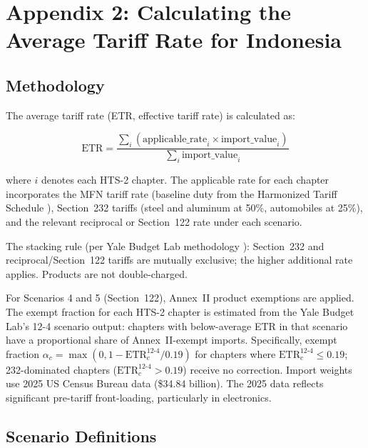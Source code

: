 \documentclass[12pt,a4paper]{article}
\begin{document}
\section*{Appendix 2: Calculating the Average Tariff Rate for Indonesia}

\subsection*{Methodology}

The average tariff rate (ETR, effective tariff rate) is calculated as:

\begin{equation}
\text{ETR} = \frac{\sum_{i} (\text{applicable\_rate}_i \times \text{import\_value}_i)}{\sum_{i} \text{import\_value}_i}
\end{equation}

\noindent where $i$ denotes each HTS-2 chapter. The applicable rate for each chapter incorporates the MFN tariff rate (baseline duty from the Harmonized Tariff Schedule \cite{usitc_hts,wto_tariff}), Section~232 tariffs (steel and aluminum at 50\%, automobiles at 25\%), and the relevant reciprocal or Section~122 rate under each scenario.

The stacking rule (per Yale Budget Lab methodology \cite{yalebudgetlab_model}): Section~232 and reciprocal/Section~122 tariffs are mutually exclusive; the higher additional rate applies. Products are not double-charged.

For Scenarios 4 and 5 (Section~122), Annex~II product exemptions are applied. The exempt fraction for each HTS-2 chapter is estimated from the Yale Budget Lab's 12-4 scenario output: chapters with below-average ETR in that scenario have a proportional share of Annex~II-exempt imports. Specifically, exempt fraction $\alpha_c = \max(0, 1 - \text{ETR}_{c}^{12\text{-}4}/0.19)$ for chapters where $\text{ETR}_{c}^{12\text{-}4} \leq 0.19$; 232-dominated chapters ($\text{ETR}_{c}^{12\text{-}4} > 0.19$) receive no correction. Import weights use 2025 US Census Bureau data (\$34.84 billion). The 2025 data reflects significant pre-tariff front-loading, particularly in electronics.

\subsection*{Scenario Definitions}
\end{document}
